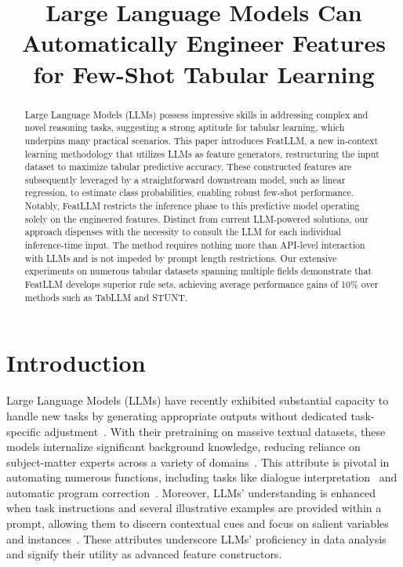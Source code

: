 \title{Large Language Models Can Automatically Engineer Features for Few-Shot Tabular Learning}

\begin{abstract}
Large Language Models (LLMs) possess impressive skills in addressing complex and novel reasoning tasks, suggesting a strong aptitude for tabular learning, which underpins many practical scenarios. This paper introduces \textsf{FeatLLM}, a new in-context learning methodology that utilizes LLMs as feature generators, restructuring the input dataset to maximize tabular predictive accuracy. These constructed features are subsequently leveraged by a straightforward downstream model, such as linear regression, to estimate class probabilities, enabling robust few-shot performance. Notably, \textsf{FeatLLM} restricts the inference phase to this predictive model operating solely on the engineered features. Distinct from current LLM-powered solutions, our approach dispenses with the necessity to consult the LLM for each individual inference-time input. The method requires nothing more than API-level interaction with LLMs and is not impeded by prompt length restrictions. Our extensive experiments on numerous tabular datasets spanning multiple fields demonstrate that \textsf{FeatLLM} develops superior rule sets, achieving average performance gains of 10\% over methods such as TabLLM and STUNT.
\end{abstract}

\section{Introduction}
Large Language Models (LLMs) have recently exhibited substantial capacity to handle new tasks by generating appropriate outputs without dedicated task-specific adjustment~\cite{creswell2022selection,imani2023mathprompter,taylor2022galactica}. With their pretraining on massive textual datasets, these models internalize significant background knowledge, reducing reliance on subject-matter experts across a variety of domains~\cite{Genomes2021,singhal2023large,wilcox2003role}. This attribute is pivotal in automating numerous functions, including tasks like dialogue interpretation~\cite{finch2023leveraging} and automatic program correction~\cite{fan2023automated}. Moreover, LLMs' understanding is enhanced when task instructions and several illustrative examples are provided within a prompt, allowing them to discern contextual cues and focus on salient variables and instances~\cite{brown2020language,zhao2023survey}. These attributes underscore LLMs' proficiency in data analysis and signify their utility as advanced feature constructors.

